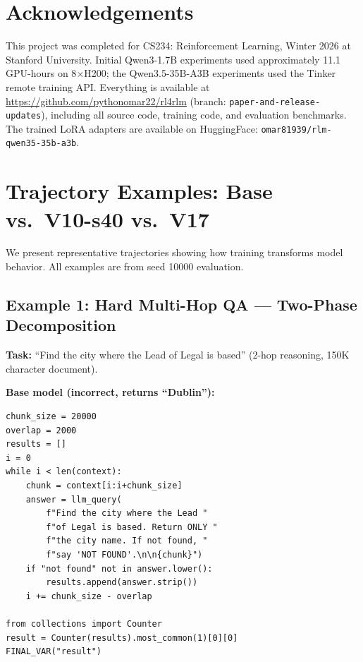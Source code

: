 \documentclass{article}
\begin{document}
\section*{Acknowledgements}

This project was completed for CS234: Reinforcement Learning, Winter 2026 at Stanford University. Initial Qwen3-1.7B experiments used approximately 11.1 GPU-hours on 8$\times$H200; the Qwen3.5-35B-A3B experiments used the Tinker remote training API. Everything is available at \url{https://github.com/pythonomar22/rl4rlm} (branch: \texttt{paper-and-release-updates}), including all source code, training code, and evaluation benchmarks. The trained LoRA adapters are available on HuggingFace: \texttt{omar81939/rlm-qwen35-35b-a3b}.

\appendix

\section{Trajectory Examples: Base vs.\ V10-s40 vs.\ V17}
\label{app:trajectories}

We present representative trajectories showing how training transforms model behavior. All examples are from seed 10000 evaluation.

\subsection{Example 1: Hard Multi-Hop QA --- Two-Phase Decomposition}
\label{app:traj-multihop}

\textbf{Task:} ``Find the city where the Lead of Legal is based'' (2-hop reasoning, 150K character document).

\textbf{Base model (incorrect, returns ``Dublin''):}
{\footnotesize
\begin{verbatim}
chunk_size = 20000
overlap = 2000
results = []
i = 0
while i < len(context):
    chunk = context[i:i+chunk_size]
    answer = llm_query(
        f"Find the city where the Lead "
        f"of Legal is based. Return ONLY "
        f"the city name. If not found, "
        f"say 'NOT FOUND'.\n\n{chunk}")
    if "not found" not in answer.lower():
        results.append(answer.strip())
    i += chunk_size - overlap

from collections import Counter
result = Counter(results).most_common(1)[0][0]
FINAL_VAR("result")
\end{verbatim}
}
\end{document}
